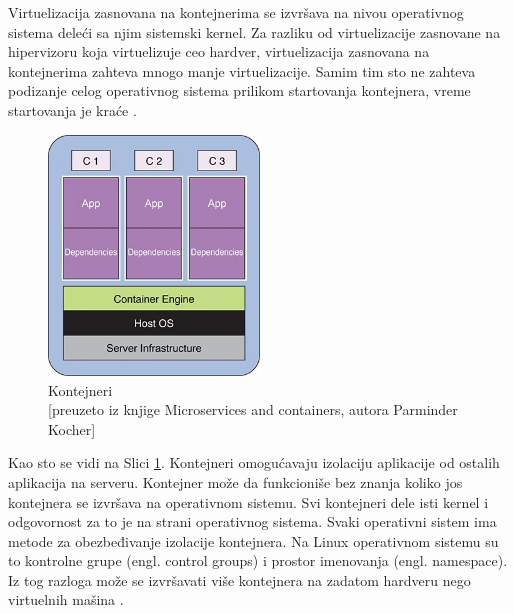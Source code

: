 \documentclass[12pt,oneside]{memoir}
\begin{document}
Virtuelizacija zasnovana na kontejnerima se izvršava na nivou operativnog sistema deleći sa njim sistemski kernel. Za razliku od virtuelizacije zasnovane na hipervizoru koja virtuelizuje ceo hardver, virtuelizacija zasnovana na kontejnerima zahteva mnogo manje virtuelizacije. Samim tim sto ne zahteva podizanje celog operativnog sistema prilikom startovanja kontejnera, vreme startovanja je kraće \cite{gswc}. 
 
\begin{figure}[!ht]
  \centering
  \includegraphics[width=0.5\textwidth]{Slika 4.jpg}
  \caption{Kontejneri\\\footnotesize[preuzeto iz knjige Microservices and containers, autora Parminder Kocher]}
  \label{fig:kontejneri}
\end{figure}


Kao sto se vidi na Slici \ref{fig:kontejneri}. Kontejneri omogućavaju izolaciju aplikacije od ostalih aplikacija na serveru. Kontejner može da funkcioniše bez znanja koliko jos kontejnera se izvršava na operativnom sistemu. Svi kontejneri dele isti kernel i odgovornost za to je na strani operativnog sistema. Svaki operativni sistem ima metode za obezbeđivanje izolacije kontejnera. Na Linux operativnom sistemu su to kontrolne grupe (engl. control groups) i prostor imenovanja (engl. namespace). Iz tog razloga može se izvršavati više kontejnera na zadatom hardveru nego virtuelnih mašina \cite{mac}. 
\end{document}
